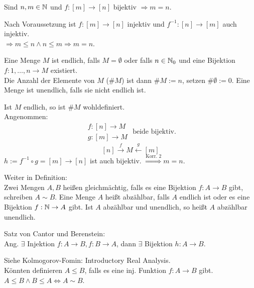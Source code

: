 \documentclass[../ana1.tex]{subfiles}
\begin{document}
\begin{kor}
	Sind \(n,m\in\mathbb{N} \) und \(f:[m]\rightarrow[n]\) bijektiv \(\Rightarrow m=n\).
\end{kor}
\begin{bew}
	Nach Voraussetzung ist \(f: [m]\rightarrow[n]\) injektiv und \(f^{-1}:[n]\rightarrow[m]\) auch injektiv.\\
	\(\Rightarrow m\leq n \wedge n \leq m \Rightarrow m = n\).
\end{bew}
\begin{defi}
	Eine Menge \(M\) ist endlich, falls \(M=\emptyset \) oder falls \(n\in\mathbb{N}_0 \) und eine Bijektion \(f:{1,\ldots,n}\rightarrow M\) existiert.\\
	Die Anzahl der Elemente von \(M\) (\( \# M \)) ist dann \( \#M:=n\), setzen \( \#\emptyset := 0\). Eine Menge ist unendlich, falls sie nicht endlich ist.
	\begin{bem}
		Ist \(M\) endlich, so ist \( \#M\) wohldefiniert. \\
		Angenommen:
		\[ \begin{array}{lr}
				f:[n]\rightarrow M \\
				g:[m]\rightarrow M
			\end{array}
			\text{ beide bijektiv.}\]
		\[ [n]\overset{f}{\longrightarrow} M \overset{g}{\longleftarrow} [m] \]
		\( h:= f^{-1}\circ g = [m]\rightarrow[n]\) ist auch bijektiv. \(\overset{\text{Korr. 2}}{\Rightarrow} m=n\).
	\end{bem}
	Weiter in Definition:\\
	Zwei Mengen \(A,B\) heißen gleichmächtig, falls es eine Bijektion \(f: A\rightarrow B\) gibt, schreiben \(A\sim B\). Eine Menge \(A\) heißt abzählbar, falls \(A\) endlich ist oder es eine Bijektion \(f: \mathbb{N}\rightarrow A\) gibt. Ist \(A\) abzählbar und unendlich, so heißt \(A\) abzählbar unendlich.
\end{defi}
\begin{bem}
	Satz von Cantor und Berenstein:\\
	Ang. \(\exists \) Injektion \(f:A\rightarrow B, f:B\rightarrow A\), dann \(\exists \) Bijektion \(h:A\rightarrow B\).
\end{bem}
\begin{bew}
	Siehe Kolmogorov-Fomin: Introductory Real Analysis.\\
	Könnten definieren \(A\leq B\), falls es eine inj. Funktion \(f: A\rightarrow B\) gibt.\\
	\(A\leq B \wedge B\leq A \Leftrightarrow A\sim B\).
\end{bew}
\end{document}
